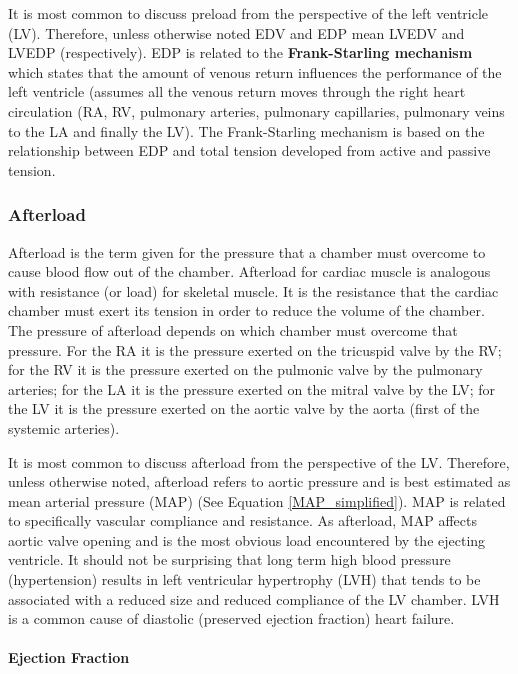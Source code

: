 It is most common to discuss preload from the perspective of the left ventricle (LV). Therefore, unless otherwise noted EDV and EDP mean LVEDV and LVEDP (respectively). EDP is related to the \textbf{Frank-Starling mechanism} which states that the amount of venous return influences the performance of the left ventricle (assumes all the venous return moves through the right heart circulation (RA, RV, pulmonary arteries, pulmonary capillaries, pulmonary veins to the LA and finally the LV). The Frank-Starling mechanism is based on the relationship between EDP and total tension developed from active and passive tension.

\subsubsection{Afterload}
Afterload is the term given for the pressure that a chamber must overcome to cause blood flow out of the chamber. Afterload for cardiac muscle is analogous with resistance (or load) for skeletal muscle. It is the resistance that the cardiac chamber must exert its tension in order to reduce the volume of the chamber. The pressure of afterload depends on which chamber must overcome that pressure. For the RA it is the pressure exerted on the tricuspid valve by the RV; for the RV it is the pressure exerted on the pulmonic valve by the pulmonary arteries; for the LA it is the pressure exerted on the mitral valve by the LV; for the LV it is the pressure exerted on the aortic valve by the aorta (first of the systemic arteries). 

It is most common to discuss afterload from the perspective of the LV. Therefore, unless otherwise noted, afterload refers to aortic pressure and is best estimated as mean arterial pressure (MAP) (See Equation \ref{MAP_simplified}). MAP is related to specifically vascular compliance and resistance. As afterload, MAP affects aortic valve opening and is the most obvious load encountered by the ejecting ventricle. It should not be surprising that long term high blood pressure (hypertension) results in left ventricular hypertrophy (LVH) that tends to be associated with a reduced size and reduced compliance of the LV chamber. LVH is a common cause of diastolic (preserved ejection fraction) heart failure.

\paragraph{Ejection Fraction}

